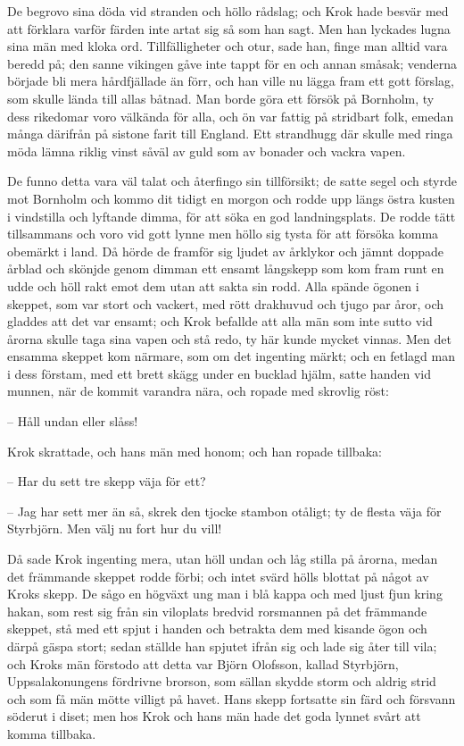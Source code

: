 \initial De begrovo sina döda vid stranden och höllo rådslag; och Krok hade besvär med att förklara varför färden inte artat sig så som han sagt. Men han lyckades lugna sina män med kloka ord. Tillfälligheter och otur, sade han, finge man alltid vara beredd på; den sanne vikingen gåve inte tappt för en och annan småsak; venderna började bli mera hårdfjällade än förr, och han ville nu lägga fram ett gott förslag, som skulle lända till allas båtnad. Man borde göra ett försök på Bornholm, ty dess rikedomar voro välkända för alla, och ön var fattig på stridbart folk, emedan många därifrån på sistone farit till England. Ett strandhugg där skulle med ringa möda lämna riklig vinst såväl av guld som av bonader och vackra vapen.

\initial De funno detta vara väl talat och återfingo sin tillförsikt; de satte segel och styrde mot Bornholm och kommo dit tidigt en morgon och rodde upp längs östra kusten i vindstilla och lyftande dimma, för att söka en god landningsplats. De rodde tätt tillsammans och voro vid gott lynne men höllo sig tysta för att försöka komma obemärkt i land. Då hörde de framför sig ljudet av årklykor och jämnt doppade årblad och skönjde genom dimman ett ensamt långskepp som kom fram runt en udde och höll rakt emot dem utan att sakta sin rodd. Alla spände ögonen i skeppet, som var stort och vackert, med rött drakhuvud och tjugo par åror, och gladdes att det var ensamt; och Krok befallde att alla män som inte sutto vid årorna skulle taga sina vapen och stå redo, ty här kunde mycket vinnas. Men det ensamma skeppet kom närmare, som om det ingenting märkt; och en fetlagd man i dess förstam, med ett brett skägg under en bucklad hjälm, satte handen vid munnen, när de kommit varandra nära, och ropade med skrovlig röst:

– Håll undan eller slåss!

Krok skrattade, och hans män med honom; och han ropade tillbaka:

– Har du sett tre skepp väja för ett?

– Jag har sett mer än så, skrek den tjocke stambon otåligt; ty de flesta väja för Styrbjörn. Men välj nu fort hur du vill!

\initial Då sade Krok ingenting mera, utan höll undan och låg stilla på årorna, medan det främmande skeppet rodde förbi; och intet svärd hölls blottat på något av Kroks skepp. De sågo en högväxt ung man i blå kappa och med ljust fjun kring hakan, som rest sig från sin viloplats bredvid rorsmannen på det främmande skeppet, stå med ett spjut i handen och betrakta dem med kisande ögon och därpå gäspa stort; sedan ställde han spjutet ifrån sig och lade sig åter till vila; och Kroks män förstodo att detta var Björn Olofsson, kallad Styrbjörn, Uppsalakonungens fördrivne brorson, som sällan skydde storm och aldrig strid och som få män mötte villigt på havet. Hans skepp fortsatte sin färd och försvann söderut i diset; men hos Krok och hans män hade det goda lynnet svårt att komma tillbaka.

